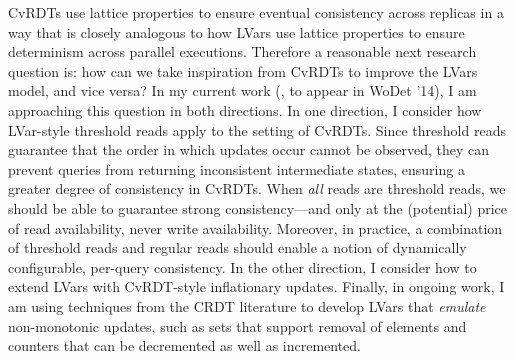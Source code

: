 \documentclass{article}
\begin{document}
CvRDTs use lattice properties to ensure eventual consistency across
replicas in a way that is closely analogous to how LVars use lattice
properties to ensure determinism across parallel executions.
Therefore a reasonable next research question is: how can we take
inspiration from CvRDTs to improve the LVars model, and vice versa?
In my current work (\cite{joining-wodet}, to appear in WoDet '14), I
am approaching this question in both directions.  In one direction, I
consider how LVar-style threshold reads apply to the setting of
CvRDTs.  Since threshold reads guarantee that the order in which
updates occur cannot be observed, they can prevent queries from
returning inconsistent intermediate states, ensuring a greater degree
of consistency in CvRDTs.  When \emph{all} reads are threshold reads,
we should be able to guarantee strong consistency---and only at the
(potential) price of read availability, never write
availability. Moreover, in practice, a combination of threshold reads
and regular reads should enable a notion of dynamically configurable,
per-query consistency.  In the other direction, I consider how to
extend LVars with CvRDT-style inflationary updates.  Finally, in
ongoing work, I am using techniques from the CRDT literature
\cite{crdts-tr} to develop LVars that \emph{emulate} non-monotonic
updates, such as sets that support removal of elements and counters
that can be decremented as well as incremented.


\newcommand{\myname}[0]{\textbf{Lindsey Kuper}}

\end{document}
